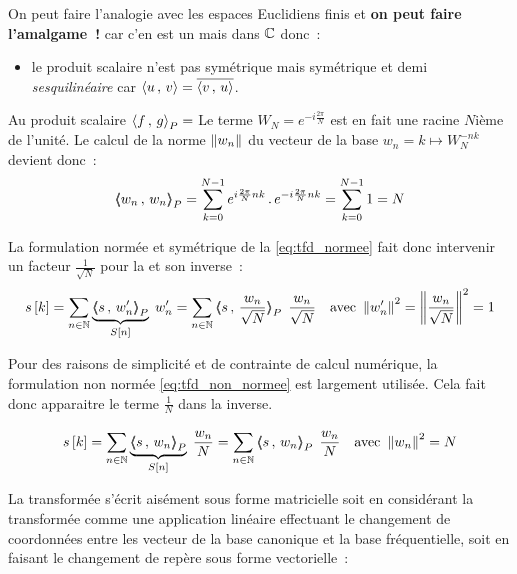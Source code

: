

On peut faire l'analogie avec les espaces Euclidiens finis et \textbf{on peut faire l'amalgame~!} car c'en est un mais dans $\mathbb{C}$ donc~:
\begin{itemize}
\item le produit scalaire n'est pas symétrique mais \og{}symétrique et demi\fg{} \cad \emph{sesquilinéaire} car $\langle u\,,\,v\rangle=\overline{\langle v\,,\,u\rangle}$.
\end{itemize}

\begin{remarque}
  Au  produit scalaire $\langle f\,,\,g{\rangle}_P=$
  Le terme $W_N= e^{-i \frac{2 \pi}{N}}$ est en fait une racine $N$ième de l'unité. Le calcul de la norme $\left\|w_n\right\|$ du vecteur de la base $w_n=k\mapsto W_N^{-nk}$ devient donc~: $$\langle\!\!\langle w_n\,,\,w_n{\rangle\!\!\rangle}_P=\sum\limits_{k=0}^{N-1}{e^{i \frac{2 \pi}{N}nk}\,.\,e^{-i \frac{2 \pi}{N}nk}} =\sum\limits_{k=0}^{N-1}{1}=N $$

  La formulation normée et symétrique de la \TFD{} \eqref{eq:tfd_normee} fait donc intervenir un facteur $\frac{1}{\sqrt{N}}$ pour la \TFD{} et son inverse~:
\begin{eqnarray}
    \label{eq:tfd_normee}
    s\b{k} = \somme{n\in\N}{}{\caCest{\scaldp{s}{w_n'}}{S\b{n}}\; w_n'} &= \somme{n\in\N}{}{\scaldp{s}{\frac{w_n}{\sqrt{N}}}}\;\, \frac{w_n}{\sqrt{N}} &\text{avec } \norme{w_n'}^2=\norme{\frac{w_n}{\sqrt{N}}}^2=1
  \end{eqnarray}
  
  Pour des raisons de simplicité et de contrainte de calcul numérique, la formulation non normée \eqref{eq:tfd_non_normee} est largement utilisée. Cela fait donc apparaitre le terme $\frac{1}{N}$ dans la \TFD{} inverse.

  \begin{eqnarray}
    \label{eq:tfd_non_normee}
    s\b{k} = \somme{n\in\N}{}{\caCest{\scaldp{s}{w_n}}{S\b{n}}\;\frac{w_n}{N}} &= \somme{n\in\N}{}{\scaldp{s}{w_n}}\;\, \frac{w_n}{N}&\text{avec } \norme{w_n}^2=N
  \end{eqnarray}
\end{remarque}

La transformée s'écrit aisément sous forme matricielle soit en considérant la transformée comme une application linéaire effectuant le changement de coordonnées entre les vecteur de la base canonique et la base fréquentielle, soit en faisant le changement de repère sous forme vectorielle~:

